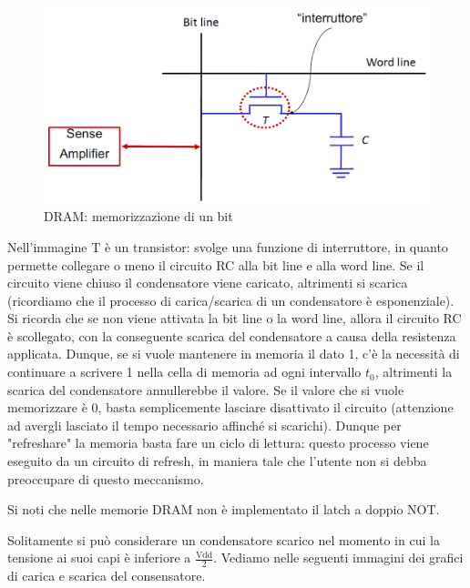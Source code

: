 \documentclass[class=book, crop=false, oneside]{standalone}
\begin{document}
\begin{figure}[H]
	\centering
	\includegraphics[width=\textwidth,keepaspectratio]{cella_DRAM.png}
	\caption{DRAM: memorizzazione di un bit}
\end{figure}

Nell'immagine \(\textrm{T}\) è un transistor: svolge una funzione di interruttore, in quanto permette collegare o meno il circuito RC alla bit line e alla word line. Se il circuito viene chiuso il condensatore viene caricato, altrimenti si scarica (ricordiamo che il processo di carica/scarica di un condensatore è esponenziale). Si ricorda che se non viene attivata la bit line o la word line, allora il circuito RC è scollegato, con la conseguente scarica del condensatore a causa della resistenza applicata. Dunque, se si vuole mantenere in memoria il dato 1, c'è la necessità di continuare a scrivere 1 nella cella di memoria ad ogni intervallo \(t_0\), altrimenti la scarica del condensatore annullerebbe il valore. Se il valore che si vuole memorizzare è 0, basta semplicemente lasciare disattivato il circuito (attenzione ad avergli lasciato il tempo necessario affinché si scarichi). Dunque per "refreshare" la memoria basta fare un ciclo di lettura: questo processo viene eseguito da un circuito di refresh, in maniera tale che l'utente non si debba preoccupare di questo meccanismo.

Si noti che nelle memorie DRAM non è implementato il latch a doppio NOT.

Solitamente si può considerare un condensatore scarico nel momento in cui la tensione ai suoi capi è inferiore a \(\frac{\textrm{Vdd}}{2}\). Vediamo nelle seguenti immagini dei grafici di carica e scarica del consensatore.

\end{document}
